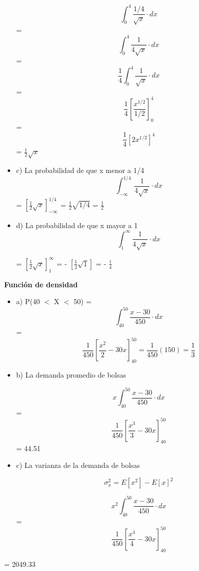\documentclass{../oxmathproblems}
\begin{document}
\begin{questions}
\begin{itemize}
\begin{equation}
\int_{0}^{4} \frac{1/4}{\sqrt{x}} \cdot dx
\end{equation}
= 
\begin{equation}
\int_{0}^{4} \frac{1}{4\sqrt{x}} \cdot dx
\end{equation}
= 
\begin{equation}
 \frac{1}{4} \int_{0}^{4} \frac{1}{\sqrt{x}} \cdot dx
\end{equation}
= 
$$ \frac{1}{4}[\frac{x^{1/2}}{1/2}]^{4}_{0}
$$
= $$ \frac{1}{4}[2x^{1/2}]^{4}
$$
= $\frac{1}{2}\sqrt{x}$


\item  c) La probabilidad de que x menor a 1/4
\begin{equation}
\int_{-\infty}^{1/4} \frac{1}{4\sqrt{x}} \cdot dx
\end{equation} 
=  $[\frac{1}{2}\sqrt{x}]_{-\infty}^{1/4}$ = $\frac{1}{2}\sqrt{1/4}$
= $\frac{1}{2}$ 


\item  d) La probabilidad de que x mayor a 1
\begin{equation}
 \int_{1}^{\infty} \frac{1}{4\sqrt{x}} \cdot dx
\end{equation}

=  $[\frac{1}{2}\sqrt{x}]_{1}^{\infty}$ = - $[\frac{1}{2}\sqrt{1}]$ = - $\frac{1}{4}$ 

\end{itemize}

\miquestion\textbf{Función de densidad}
\begin{itemize}
\item  a) 
 P(40 $<$ X $<$ 50) = 
\begin{equation}
 \int_{40}^{50} \frac{x-30}{450} \cdot dx
\end{equation} 
= $$ \frac{1}{450} [\frac{x^2}{2}-30x]^{50}_{40} = \frac{1}{450}(150) = \frac{1}{3} $$ 

\item  b) La demanda promedio de bolsas 

\begin{equation}
 x \int_{40}^{50} \frac{x-30}{450} \cdot dx
\end{equation} 
= $$ \frac{1}{450} [\frac{x^3}{3}-30x]^{50}_{40} $$ = 44.51


\item  c) La varianza de la demanda de bolsas

$$ \sigma_x^2 = E[x^2]-E[x]^2 $$ 

\begin{equation}
x^2 \int_{40}^{50} \frac{x-30}{450} \cdot dx
\end{equation} 
= $$ \frac{1}{450} [\frac{x^4}{4}-30x]^{50}_{40} $$
\end{itemize} 
= 2049.33


\end{questions}
\end{document}

